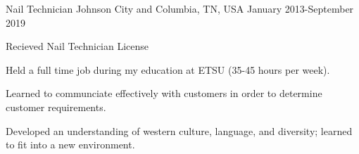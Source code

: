 

\begin{cventries}

  \cventry
    {Nail Technician} %
    {} %
    {Johnson City and Columbia, TN, USA} %
    {January 2013-September 2019} %
    {
      \begin{cvitems} %
      \item Recieved Nail Technician License
      \item Held a full time job during my education at ETSU (35-45 hours per week).
      \item Learned to communciate effectively with customers in order to determine customer requirements.
      \item Developed an understanding of western culture, language, and diversity; learned to fit into a new environment.
      \end{cvitems}
    }


\end{cventries}
